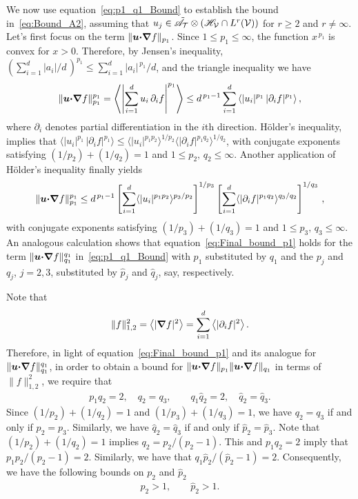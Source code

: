 \documentclass[amsa]{ipart}
\begin{document}
We now use equation~\eqref{eq:p1_q1_Bound} to establish the bound
in~\eqref{eq:Bound_A2}, assuming that
$u_j\in\tilde{\mathscr{A}}_{\mathcal{T}}\otimes(\mathscr{H}_{\mathcal{V}}\cap L^r(\mathcal{V}))$ for $r\geq2$ and
$r\neq\infty$. Let's first focus 
on the term $\|\boldsymbol{u}\mbox{\boldmath${\cdot}$}\mbox{\boldmath${\nabla}$} f\|_{p_1}$.  Since $1\leq p_1\leq\infty$,
the function $x^{\,p_1}$ is convex for $x>0$. Therefore, by Jensen's
inequality, $(\sum_{i=1}^d|a_i|/d\,)^{p_1}\leq\sum_{i=1}^d|a_i|^{\,p_1}/d$, and the
triangle inequality we have
%
\begin{align}
  \|\vecu\bcdot\bnabla f\|^{p_1}_{p_1}
  =\left\langle\left|\sum_{i=1}^du_i\,\partial_if\right|^{p_1}\right\rangle
  \leq d^{\,p_1-1}\sum_{i=1}^d\left\langle|u_i|^{p_1}\,|\partial_if|^{p_1} \right\rangle,
\end{align}
%
where $\partial_i$ denotes partial differentiation in the $i$th
direction. H{\"o}lder's inequality, implies that
$\langle|u_i|^{p_1}\,|\partial_if|^{p_1}\rangle\leq\langle|u_i|^{p_1p_2}\rangle^{1/p_2}\langle|\partial_if|^{p_1q_2}\rangle^{1/q_2}$,
with conjugate exponents satisfying $(1/p_2)+(1/q_2)=1$ and $1\leq
p_2,\,q_2\leq\infty$. 
Another application of H{\"o}lder's inequality finally yields
%
\begin{align}\label{eq:Final_bound_p1}
  \|\vecu\bcdot\bnabla f\|^{p_1}_{p_1}
  \leq d^{\,p_1-1}
   \left[\sum_{i=1}^d\langle|u_i|^{p_1p_2}\rangle^{p_3/p_2}\right]^{1/p_3}
   \left[\sum_{i=1}^d\langle|\partial_if|^{p_1q_2}\rangle^{q_3/q_2}\right]^{1/q_3}\,,
\end{align}
%
with conjugate exponents satisfying $(1/p_3)+(1/q_3)=1$ and $1\leq
p_3,\,q_3\leq\infty$.
An analogous calculation shows that equation~\eqref{eq:Final_bound_p1}
holds for the term $\|\boldsymbol{u}\mbox{\boldmath${\cdot}$}\mbox{\boldmath${\nabla}$} f\|^{q_1}_{q_1}$
in~\eqref{eq:p1_q1_Bound} with $p_1$ 
substituted by $q_1$ and the $p_j$ and $q_j$, $j=2,3$, substituted
by $\hat{p}_j$ and $\hat{q}_j$, say, respectively.




Note that
%
\begin{align}
  \|f\|^2_{1,2}=\left\langle|\bnabla f|^2\right\rangle=\sum_{i=1}^d\left\langle|\partial_if|^2\right\rangle.
\end{align}
%
Therefore, in light of equation~\eqref{eq:Final_bound_p1} and its
analogue for $\|\boldsymbol{u}\mbox{\boldmath${\cdot}$}\mbox{\boldmath${\nabla}$} f\|^{q_1}_{q_1}$, in order to obtain
a bound for $\|\boldsymbol{u}\mbox{\boldmath${\cdot}$}\mbox{\boldmath${\nabla}$} f\|_{p_1}\|\boldsymbol{u}\mbox{\boldmath${\cdot}$}\mbox{\boldmath${\nabla}$} f\|_{q_1}$
in terms of $\|f\|^2_{1,2}$, we require that
%
\begin{align}\label{eq:Restrictions_pi_qi}
  p_1q_2=2, \quad q_2=q_3,
  \qquad
  q_1\hat{q}_2=2, \quad \hat{q}_2=\hat{q}_3.
\end{align}
%
Since $(1/p_2)+(1/q_2)=1$ and $(1/p_3)+(1/q_3)=1$, we have
$q_2=q_3$ if and only if $p_2=p_3$. Similarly, we have
$\hat{q}_2=\hat{q}_3$ if and only if $\hat{p}_2=\hat{p}_3$. Note that
$(1/p_2)+(1/q_2)=1$ implies $q_2=p_2/(p_2-1)$. This and $p_1q_2=2$
imply that $p_1p_2/(p_2-1)=2$. Similarly, we have that
$q_1\hat{p}_2/(\hat{p}_2-1)=2$.
Consequently, we have the following bounds on $p_2$ and $\hat{p}_2$
%
\begin{align}\label{eq:p_2_gtr_1}
  p_2>1, \qquad \hat{p}_2>1.
\end{align}
%
\end{document}
